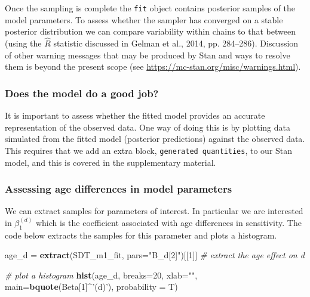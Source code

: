 \documentclass[
  english,
  ,man,floatsintext]{apa6}
\newenvironment{Shaded}{\begin{snugshade}}{\end{snugshade}}
\newcommand{\CommentTok}[1]{\textcolor[rgb]{0.56,0.35,0.01}{\textit{#1}}}
\newcommand{\DataTypeTok}[1]{\textcolor[rgb]{0.13,0.29,0.53}{#1}}
\newcommand{\DecValTok}[1]{\textcolor[rgb]{0.00,0.00,0.81}{#1}}
\newcommand{\KeywordTok}[1]{\textcolor[rgb]{0.13,0.29,0.53}{\textbf{#1}}}
\newcommand{\NormalTok}[1]{#1}
\newcommand{\OperatorTok}[1]{\textcolor[rgb]{0.81,0.36,0.00}{\textbf{#1}}}
\newcommand{\StringTok}[1]{\textcolor[rgb]{0.31,0.60,0.02}{#1}}
\begin{document}
Once the sampling is complete the \texttt{fit} object contains posterior samples of the model parameters. To assess whether the sampler has converged on a stable posterior distribution we can compare variability within chains to that between (using the \(\hat{R}\) statistic discussed in Gelman et al., 2014, pp. 284--286). Discussion of other warning messages that may be produced by Stan and ways to resolve them is beyond the present scope (see \url{https://mc-stan.org/misc/warnings.html}).

\hypertarget{does-the-model-do-a-good-job}{%
\subsubsection{Does the model do a good job?}\label{does-the-model-do-a-good-job}}

It is important to assess whether the fitted model provides an accurate representation of the observed data. One way of doing this is by plotting data simulated from the fitted model (posterior predictions) against the observed data. This requires that we add an extra block, \texttt{generated\ quantities}, to our Stan model, and this is covered in the supplementary material.

\hypertarget{assessing-age-differences-in-model-parameters}{%
\subsubsection{Assessing age differences in model parameters}\label{assessing-age-differences-in-model-parameters}}

We can extract samples for parameters of interest. In particular we are interested in \(\beta^{(d)}_1\) which is the coefficient associated with age differences in sensitivity. The code below extracts the samples for this parameter and plots a histogram.

\begin{Shaded}
\begin{Highlighting}[]
\NormalTok{age_d =}\StringTok{ }\KeywordTok{extract}\NormalTok{(SDT_m1_fit, }\DataTypeTok{pars=}\StringTok{"B_d[2]"}\NormalTok{)[[}\DecValTok{1}\NormalTok{]] }\CommentTok{# extract the age effect on d}
\end{Highlighting}
\end{Shaded}

\begin{Shaded}
\begin{Highlighting}[]
\CommentTok{# plot a histogram}
\KeywordTok{hist}\NormalTok{(age_d, }\DataTypeTok{breaks=}\DecValTok{20}\NormalTok{, }\DataTypeTok{xlab=}\StringTok{""}\NormalTok{, }\DataTypeTok{main=}\KeywordTok{bquote}\NormalTok{(Beta[}\DecValTok{1}\NormalTok{]}\OperatorTok{^}\StringTok{'(d)'}\NormalTok{), }\DataTypeTok{probability =}\NormalTok{ T)}
\end{Highlighting}
\end{Shaded}
\end{document}
